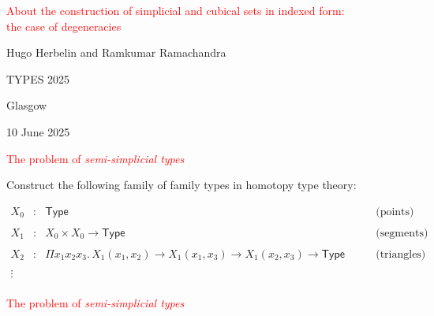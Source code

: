 \documentclass[12pt,landscape]{article}
\newcommand{\Type}{\mathsf{Type}}
\begin{document}
\begin{LARGE}
\begin{sf}

\mbox{}
\vspace{3cm}

\begin{center}

\textcolor{red}{\Huge About the construction of simplicial and cubical
  sets in indexed form:\\ the case of degeneracies}

\medskip
\bigskip
\bigskip
{\Large Hugo Herbelin and Ramkumar Ramachandra}

\bigskip
\bigskip
\bigskip
\bigskip
\bigskip
\bigskip
\bigskip
TYPES 2025

\bigskip
\bigskip
Glasgow
\bigskip

10 June 2025

\bigskip
\bigskip

\end{center}

\newcommand{\mysem}[1]{\llbracket #1 \rrbracket}
\newcommand{\deppsh}[2]{\mathsf{DepPresheaf}(#1,#2)}
\newcommand{\HSet}[1]{\mathsf{HSet}}
\newcommand{\imp}{\rightarrow}

\newpage

\begin{center}
\textcolor{red}{\huge The problem of \emph{semi-simplicial types}}
\end{center}

\bigskip
\bigskip
Construct the following family of family types in homotopy type theory:

$$
\begin{array}{cllccllll}
X_0 & : & \Type & \mbox{(points)}\\
\\
X_1 & : & X_0 \times X_0 \rightarrow \Type & \mbox{(segments)}\\
\\
X_2 & : & \Pi x_1x_2x_3.\, X_1 (x_1,x_2) \imp X_1 (x_1,x_3) \imp X_1 (x_2,x_3)\rightarrow \Type \qquad & \mbox{(triangles)}\\
\\
\vdots\\
\end{array}
$$

\newpage

\begin{center}
\textcolor{red}{\huge The problem of \emph{semi-simplicial types}}
\end{center}


\end{sf}
\end{LARGE}
\end{document}
